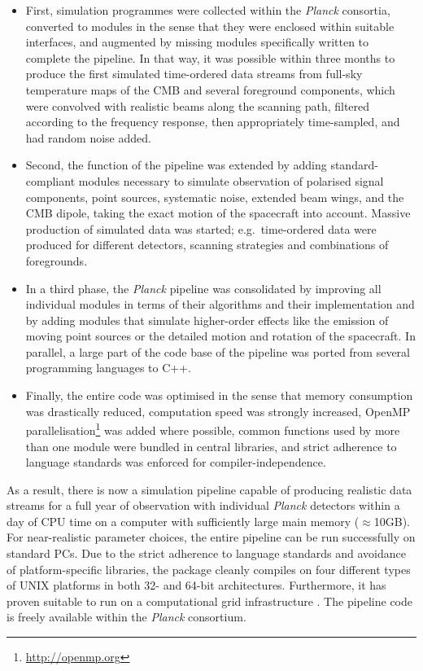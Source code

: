 \documentclass{aa}
\begin{document}
\begin{itemize}

\item First, simulation programmes were collected within the
  \emph{Planck} consortia, converted to modules in the sense that they
  were enclosed within suitable interfaces, and augmented by missing
  modules specifically written to complete the pipeline. In that way,
  it was possible within three months to produce the first simulated
  time-ordered data streams from full-sky temperature maps of the CMB
  and several foreground components, which were convolved with
  realistic beams along the scanning path, filtered according to the
  frequency response, then appropriately time-sampled, and had random
  noise added.

\item Second, the function of the pipeline was extended by adding
  standard-compliant modules necessary to simulate observation of
  polarised signal components, point sources, systematic noise,
  extended beam wings, and the CMB dipole, taking the exact motion of
  the spacecraft into account. Massive production of simulated data
  was started; e.g.\ time-ordered data were produced for different detectors,
  scanning strategies and combinations of foregrounds.

\item In a third phase, the \emph{Planck} pipeline was consolidated by
  improving all individual modules in terms of their algorithms and
  their implementation and by adding modules that simulate higher-order
  effects like the emission of moving point sources or the detailed
  motion and rotation of the spacecraft. In parallel, a large part of
  the code base of the pipeline was ported from several programming
  languages to C++.

\item Finally, the entire code was optimised in the sense that memory
  consumption was drastically reduced, computation speed was strongly
  increased, OpenMP parallelisation\footnote{\href{http://openmp.org}
  {http://openmp.org}} was added where
  possible, common functions used by more than one module were
  bundled in central libraries, and strict adherence to language
  standards was enforced for compiler-independence.

\end{itemize}

As a result, there is now a simulation pipeline capable of producing
realistic data streams for a full year of observation with individual
\emph{Planck} detectors within a day of CPU time on a computer with
sufficiently large main memory ($\approx$10GB). For
near-realistic parameter choices, the entire pipeline can be run successfully
on standard PCs. Due to the strict adherence to language
standards and avoidance of platform-specific libraries, the package
cleanly compiles on four different types of UNIX platforms in both 32-
and 64-bit architectures. Furthermore, it has proven suitable
to run on a computational grid infra\-structure
\citep{taffoni-etal-2005}. The pipeline code is freely available within
the \emph{Planck} consortium.
\end{document}
